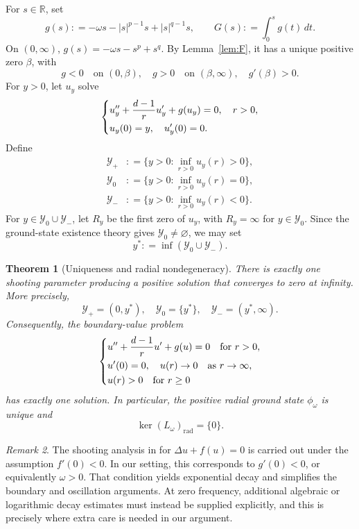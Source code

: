 \documentclass[12pt, a4paper, reqno]{amsart}
\numberwithin{equation}{section}
\newtheorem{theorem}{Theorem}[section]
\theoremstyle{definition}
\theoremstyle{remark}
\newtheorem{remark}[theorem]{Remark}
\newcommand{\R}{\mathbb R}
\newcommand{\rad}{\mathrm{rad}}
\newcommand{\ce}{\mathrel{\mathop:}=}
\begin{document}
For $s\in\R$, set
\[
  g(s)\ce -\omega s-|s|^{p-1}s+|s|^{q-1}s,
  \qquad
  G(s)\ce \int_0^s g(t)\,dt.
\]
On $(0,\infty)$, $g(s)=-\omega s-s^p+s^q$. By Lemma~\ref{lem:F}, it has
a unique positive zero $\beta$, with
\[
  g<0\quad\text{on }(0,\beta),
  \quad
  g>0\quad\text{on }(\beta,\infty),
  \quad
  g'(\beta)>0.
\]
For $y>0$, let $u_y$ solve
\begin{equation*}
\begin{dcases}
  u_y''+\dfrac{d-1}{r}u_y'+g(u_y)=0, \quad r>0,\\
  u_y(0)=y,\quad u_y'(0)=0.
\end{dcases}
\end{equation*}
Define
\begin{align*}
  \mathcal Y_+&\ce \bigl\{y>0:\inf_{r>0}u_y(r)>0\bigr\},\\
  \mathcal Y_0&\ce \bigl\{y>0:\inf_{r>0}u_y(r)=0\bigr\},\\
  \mathcal Y_-&\ce \bigl\{y>0:\inf_{r>0}u_y(r)<0\bigr\}.
\end{align*}
For $y\in \mathcal Y_0\cup \mathcal Y_-$, let $R_y$ be the first zero of $u_y$, with
$R_y=\infty$ for $y\in \mathcal Y_0$. Since the ground-state existence theory
gives $\mathcal Y_0\ne\varnothing$, we may set
\begin{equation}\label{eq:ystar}
  y^*\ce \inf(\mathcal Y_0\cup \mathcal Y_-).
\end{equation}

\begin{theorem}[Uniqueness and radial nondegeneracy]
\label{thm:shoot}
There is exactly one shooting parameter producing a positive solution that
converges to zero at infinity. More precisely,
\[
  \mathcal Y_+=(0,y^*),
  \quad
  \mathcal Y_0=\{y^*\},
  \quad
  \mathcal Y_-=(y^*,\infty).
\]
Consequently, the boundary-value problem
\[
\begin{dcases}
  u''+\dfrac{d-1}{r}u'+g(u)=0\quad\text{for}~ r>0,\\
  u'(0)=0,\quad u(r)\to0 \quad\text{as }r\to\infty,\\
  u(r)>0\quad \text{for}~r\ge0 
\end{dcases}
\]
has exactly one solution. In particular, the positive radial ground state
$\phi_\omega$ is unique and
\[
  \ker(L_\omega)_{\rad}=\{0\}.
\]
\end{theorem}

\begin{remark}
The shooting analysis in \cite{M93} for $\Delta u+f(u)=0$
is carried out under the assumption $f'(0)<0$.
In our setting, this corresponds to $g'(0)<0$, or equivalently
$\omega>0$.
That condition yields exponential decay and simplifies the boundary
and oscillation arguments.
At zero frequency, additional algebraic or logarithmic
decay estimates must instead be supplied explicitly, and this is
precisely where extra care is needed in our argument.
\end{remark}
\end{document}
